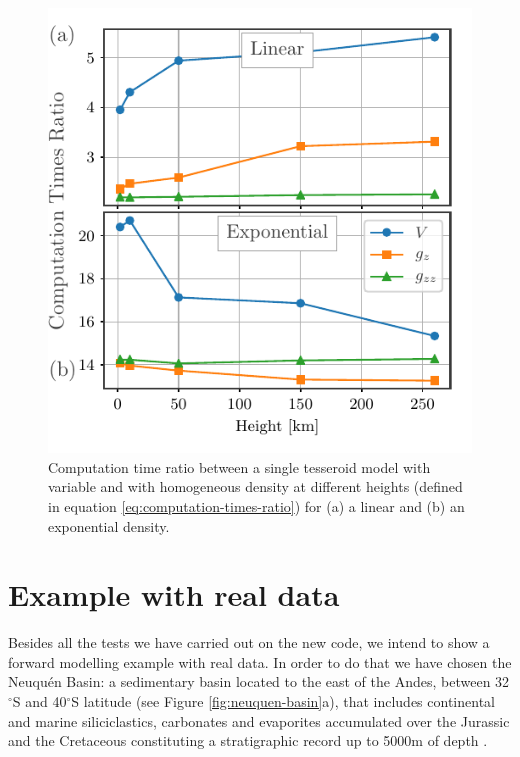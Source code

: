 \documentclass[extra]{gji}
\begin{document}
\begin{figure}
\centering
\includegraphics[width=0.9\linewidth]{figures/speed-comparison.pdf}
\caption{Computation time ratio between a single tesseroid model with variable and with homogeneous density at different heights (defined in equation \ref{eq:computation-times-ratio}) for (a) a linear and (b) an exponential density.}
\label{fig:speed-comparison}
\end{figure}



\section{Example with real data}

Besides all the tests we have carried out on the new code, we intend to show a forward modelling example with real data.
In order to do that we have chosen the Neuqu\'en Basin: a sedimentary basin located to the east of the Andes, between 32$^\circ$S and 40$^\circ$S latitude (see Figure \ref{fig:neuquen-basin}a), that includes continental and marine siliciclastics, carbonates and evaporites accumulated over the Jurassic and the Cretaceous constituting a stratigraphic record up to 5000m of depth \citep{Howell2005}.
\end{document}

